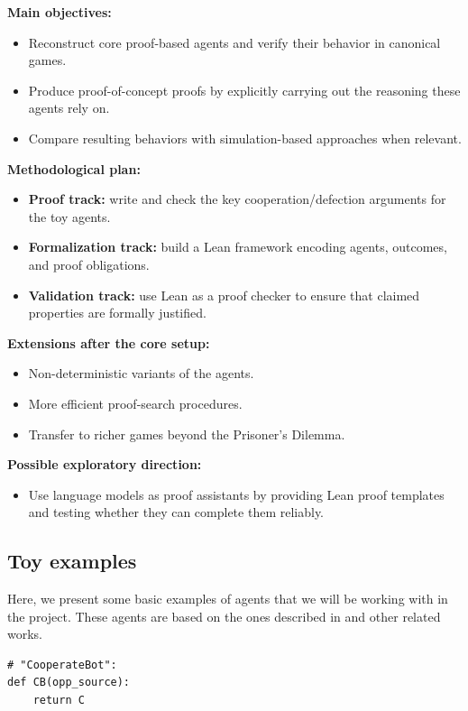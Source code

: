 \documentclass{article}
\begin{document}
\textbf{Main objectives:}
\begin{itemize}
  \item Reconstruct core proof-based agents and verify their behavior in canonical games.
  \item Produce proof-of-concept proofs by explicitly carrying out the reasoning these agents rely on.
  \item Compare resulting behaviors with simulation-based approaches when relevant.
\end{itemize}

\textbf{Methodological plan:}
\begin{itemize}
  \item \textbf{Proof track:} write and check the key cooperation/defection arguments for the toy agents.
  \item \textbf{Formalization track:} build a Lean framework encoding agents, outcomes, and proof obligations.
  \item \textbf{Validation track:} use Lean as a proof checker to ensure that claimed properties are formally justified.
\end{itemize}

\textbf{Extensions after the core setup:}
\begin{itemize}
  \item Non-deterministic variants of the agents.
  \item More efficient proof-search procedures.
  \item Transfer to richer games beyond the Prisoner's Dilemma.
\end{itemize}

\textbf{Possible exploratory direction:}
\begin{itemize}
  \item Use language models as proof assistants by providing Lean proof templates and testing whether they can complete them reliably.
\end{itemize}

\subsection{Toy examples}
Here, we present some basic examples of agents that we will be working with in the project. These agents are based on the ones described in \cite{critch2022cooperativeuncooperativeinstitutiondesigns} and other related works.

\begin{verbatim}
# "CooperateBot":
def CB(opp_source):
    return C
\end{verbatim}
\end{document}
